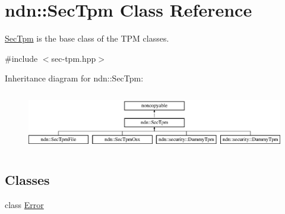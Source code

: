 \hypertarget{classndn_1_1SecTpm}{}\section{ndn\+:\+:Sec\+Tpm Class Reference}
\label{classndn_1_1SecTpm}


\hyperlink{classndn_1_1SecTpm}{Sec\+Tpm} is the base class of the T\+PM classes.  




{\ttfamily \#include $<$sec-\/tpm.\+hpp$>$}

Inheritance diagram for ndn\+:\+:Sec\+Tpm\+:\begin{figure}[H]
\begin{center}
\leavevmode
\includegraphics[height=2.592592cm]{classndn_1_1SecTpm}
\end{center}
\end{figure}
\subsection*{Classes}
\begin{DoxyCompactItemize}
\item 
class \hyperlink{classndn_1_1SecTpm_1_1Error}{Error}
\end{DoxyCompactItemize}
